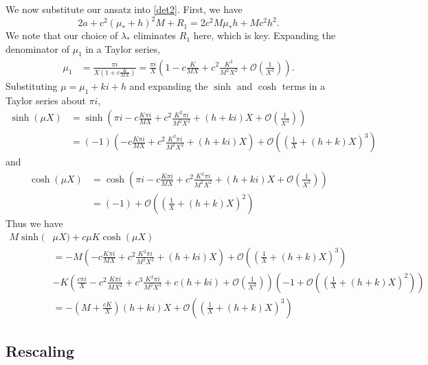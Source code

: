 \documentclass[10pt,reqno]{amsart}
\theoremstyle{plain}
\theoremstyle{definition}
\theoremstyle{remark}
\numberwithin{theorem}{section}
\numberwithin{equation}{section}
\begin{document}
We now substitute our ansatz into \cref{det2}. First, we have
\[
2a + c^2 \left(\mu_* + h \right)^2 M + R_1 = 2 c^2 M \mu_* h  + M c^2 h^2.
\]
We note that our choice of $\lambda_*$ eliminates $R_1$ here, which is key. Expanding the denominator of $\mu_1$ in a Taylor series,
\begin{align*}
\mu_1 &= \frac{\pi i}{X\left(1  + c \frac{K}{M X} \right) }
= \frac{\pi i}{X}\left( 1 - c \frac{K}{M X} + c^2 \frac{K^2}{M^2 X^2} + \mathcal{O}\left(\frac{1}{X^3}\right) \right).
\end{align*}
Substituting $\mu = \mu_1 + k i + h$ and expanding the $\sinh$ and $\cosh$ terms in a Taylor series about $\pi i$,
\begin{align*}
\sinh(\mu X) &= \sinh\left( \pi i - c \frac{K \pi i }{M X} + c^2 \frac{K^2 \pi i }{M^2 X^2} + (h + k i)X + \mathcal{O}\left(\frac{1}{X^3}\right) \right) \\
&= (-1)\left( - c \frac{K \pi i }{MX} + c^2 \frac{K^2 \pi i }{M^2 X^2} + (h + k i)X \right) + \mathcal{O}\left( \left(\frac{1}{X} + (h + k) X \right)^3 \right)
\end{align*}
and
\begin{align*}
\cosh(\mu X) &= \cosh\left( \pi i - c \frac{K \pi i }{M X} + c^2 \frac{K^2 \pi i }{M^2 X^2} + (h + k i)X + \mathcal{O}\left(\frac{1}{X^3}\right) \right) \\
&= (-1) + \mathcal{O}\left( \left(\frac{1}{X} + (h + k)X \right)^2 \right)
\end{align*}
Thus we have
\begin{align*}
M \sinh(&\mu X) + c \mu K \cosh(\mu X) \\
&= -M \left( -c \frac{K \pi i }{MX} + c^2 \frac{K^2 \pi i }{M^2 X^2} + (h + k i)X \right) + \mathcal{O}\left( \left(\frac{1}{X} + (h + k)X \right)^3 \right) \\
&- K \left( \frac{c \pi i}{X} - c^2 \frac{K \pi i}{M X^2} + c^3 \frac{K^2 \pi i}{M^2 X^3} + c (h + k i) + \mathcal{O}\left(\frac{1}{X^3}\right) \right)\left( -1 + \mathcal{O}\left( \left(\frac{1}{X} + (h + k)X \right)^2 \right) \right) \\
&= -\left( M + \frac{c K}{X}\right)(h+ki)X + \mathcal{O}\left( \left( \frac{1}{X} + (h+k)X \right)^3 \right)
\end{align*}

\subsection{Rescaling}
\end{document}

